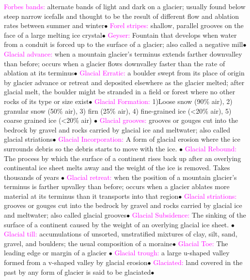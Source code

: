 \documentclass{article}
\newcommand{\ddd}{$\bullet$}
\newcommand{\pink}[1]{\textcolor{magenta}{#1}}
\newcommand{\vocab}[1]{{\pink{#1}}}
\begin{document}
\begin{multicols*}{4}
		\vocab{        Forbes bands: } alternate bands of light and dark on a glacier; usually found below steep narrow icefalls and thought to be the result of different flow and ablation rates between summer and winter\ddd
		\vocab{        Forel stripes: } shallow, parallel grooves on the face of a large melting ice crystal\ddd 
		\vocab{        Geyser: } Fountain that develops when water from a conduit is forced up to the surface of a glacier; also called a negative mill\ddd
		\vocab{        Glacial advance: } when a mountain glacier's terminus extends farther downvalley than before; occurs when a glacier flows downvalley faster than the rate of ablation at its terminus\ddd
		\vocab{        Glacial Erratic: } a boulder swept from its place of origin by glacier advance or retreat and deposited elsewhere as the glacier melted; after glacial melt, the boulder might be stranded in a field or forest where no other rocks of its type or size exist\ddd
		\vocab{Glacial Formation: } 1)Loose snow (90\% air), 2) granular snow (50\% air), 3) firn (25\% air), 4) fine-grained ice (<20\% air), 5) coarse grained ice (<20\% air) \ddd
		\vocab{        Glacial grooves: } grooves or gouges cut into the bedrock by gravel and rocks carried by glacial ice and meltwater; also called glacial striations\ddd
		\vocab{Glacial Incorporation: } A form of glacial erosion where the ice surrounds debris so the debris starts to move with the ice. \ddd
		\vocab{Glacial Rebound: } The process by which the surface of a continent rises back up after an overlying continental ice sheet melts away and the weight of the ice is removed. Takes thousands of years \ddd
		\vocab{        Glacial retreat: } when the position of a mountain glacier's terminus is farther upvalley than before; occurs when a glacier ablates more material at its terminus than it transports into that region\ddd
		\vocab{        Glacial striations: } grooves or gouges cut into the bedrock by gravel and rocks carried by glacial ice and meltwater; also called glacial grooves\ddd
		\vocab{Glacial Subsidence: } The sinking of the surface of a continent caused by the weight of an overlying glacial ice sheet. \ddd
		\vocab{        Glacial till: } accumulations of unsorted, unstratified mixtures of clay, silt, sand, gravel, and boulders; the usual composition of a moraine\ddd
		\vocab{Glacial Toe: } The leading edge or margin of a glacier \ddd
		\vocab{        Glacial trough: } a large u-shaped valley formed from a v-shaped valley by glacial erosion\ddd
		\vocab{        Glaciated: } land covered in the past by any form of glacier is said to be glaciated\ddd

\end{multicols*}
\end{document}
